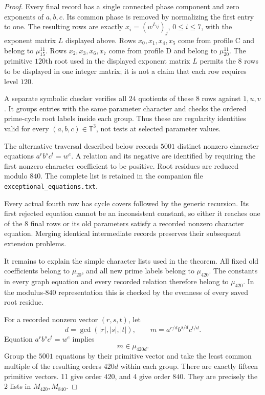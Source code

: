 \documentclass[11pt,a4paper]{article}
\theoremstyle{plain}
\theoremstyle{definition}
\theoremstyle{plain}
\begin{document}
\begin{proof}
Every final record has a single connected phase component and zero exponents of $a,b,c$. Its common phase is removed by normalizing the first entry to one. The resulting rows are exactly $x_i=(w^{L_{ij}})_j$, $0\le i\le7$, with the exponent matrix $L$ displayed above. Rows $x_0,x_1,x_4,x_5$ come from profile $\mathrm{C}$ and belong to $\mu_{15}^{11}$. Rows $x_2,x_3,x_6,x_7$ come from profile $\mathrm{D}$ and belong to $\mu_{20}^{11}$. The primitive $120$th root used in the displayed exponent matrix $L$ permits the $8$ rows to be displayed in one integer matrix; it is not a claim that each row requires level $120$.

A separate symbolic checker verifies all $24$ quotients of these 8 rows against $1,u,v$. It groups entries with the same parameter character and checks the ordered prime-cycle root labels inside each group. Thus these are regularity identities valid for every $(a,b,c)\in\mathbb T^3$, not tests at selected parameter values.

\medskip
The alternative traversal described below records $5001$ distinct nonzero character equations $a^rb^sc^t=w^e$. A relation and its negative are identified by requiring the first nonzero character coefficient to be positive. Root residues are reduced modulo $840$. The complete list is retained in the companion file \texttt{exceptional\_equations.txt}.

Every actual fourth row has cycle covers followed by the generic recursion. Its first rejected equation cannot be an inconsistent constant, so either it reaches one of the $8$ final rows or its old parameters satisfy a recorded nonzero character equation. Merging identical intermediate records preserves their subsequent extension problems.

It remains to explain the simple character lists used in the theorem. All fixed old coefficients belong to $\mu_{20}$, and all new prime labels belong to $\mu_{420}$. The constants in every graph equation and every recorded relation therefore belong to $\mu_{420}$. In the modulus-$840$ representation this is checked by the evenness of every saved root residue.

For a recorded nonzero vector $(r,s,t)$, let
$$d=\gcd(|r|,|s|,|t|),\qquad
m=a^{r/d}b^{s/d}c^{t/d}.$$
Equation $a^rb^sc^t=w^e$ implies
\[
m\in\mu_{420d}.
\]
Group the $5001$ equations by their primitive vector and take the least common multiple of the resulting orders $420d$ within each group. There are exactly fifteen primitive vectors. 11 give order $420$, and 4 give order $840$. They are precisely the 2 lists in $M_{420},M_{840}$.


\end{proof}
\end{document}
